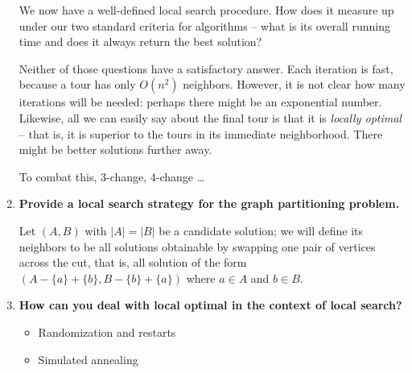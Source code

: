 \documentclass[a4paper,11pt]{article}
\begin{document}
\begin{enumerate}
  We now have a well-defined local search procedure. How does it measure
  up under our two standard criteria for algorithms -- what is its
  overall running time and does it always return the best solution?

  Neither of those questions have a satisfactory answer. Each iteration
  is fast, because a tour has only $O(n^2)$ neighbors. However, it is
  not clear how many iterations will be needed: perhaps there might be
  an exponential number. Likewise, all we can easily say about the final
  tour is that it is \emph{locally optimal} -- that is, it is superior
  to the tours in its immediate neighborhood. There might be better
  solutions further away.

  To combat this, 3-change, 4-change \ldots{}
\item
  \textbf{Provide a local search strategy for the graph partitioning
  problem.}

  Let $(A, B)$ with $|A| = |B|$ be a candidate solution; we will define
  its neighbors to be all solutions obtainable by swapping one pair of
  vertices across the cut, that is, all solution of the form
  $(A - \{a\} + \{b\}, B - \{b\} + \{a\})$ where $a \in A$ and
  $b \in B$.
\item
  \textbf{How can you deal with local optimal in the context of local
  search?}

  \begin{itemize}
  \itemsep1pt\parskip0pt
  \item
    Randomization and restarts
  \item
    Simulated annealing
  \end{itemize}
\end{enumerate}


\end{document}
